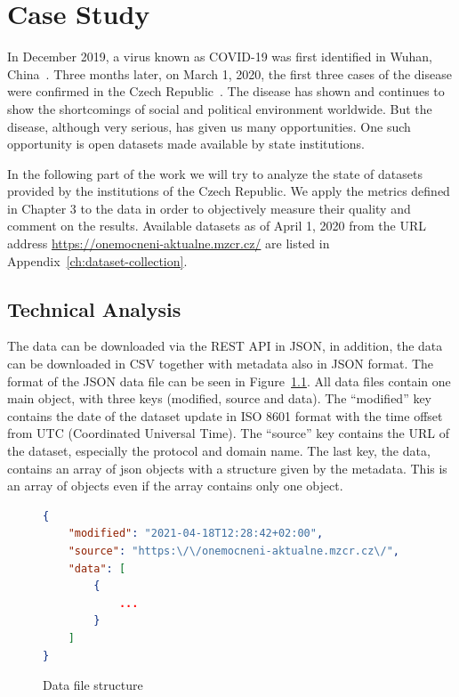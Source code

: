 \chapter{Case Study}\label{ch:case-study}

In December 2019, a virus known as COVID-19 was first identified in Wuhan, China~\cite{seznam-korona2021}.
Three months later, on March 1, 2020, the first three cases of the disease were confirmed in the Czech Republic~\cite{seznam-korona2021}.
The disease has shown and continues to show the shortcomings of social and political environment worldwide.
But the disease, although very serious, has given us many opportunities.
One such opportunity is open datasets made available by state institutions.

In the following part of the work we will try to analyze the state of datasets provided by the institutions of the Czech Republic.
We apply the metrics defined in Chapter 3 to the data in order to objectively measure their quality and comment on the results.
Available datasets as of April 1, 2020 from the URL address \url{https://onemocneni-aktualne.mzcr.cz/} are listed in Appendix~\ref{ch:dataset-collection}.

\section{Technical Analysis}

The data can be downloaded via the REST API in JSON, in addition, the data can be downloaded in CSV together with metadata also in JSON format.
The format of the JSON data file can be seen in Figure~\ref{ls:data}.
All data files contain one main object, with three keys (modified, source and data).
The \enquote{modified} key contains the date of the dataset update in ISO 8601 format with the time offset from UTC (Coordinated Universal Time).
The \enquote{source} key contains the URL of the dataset, especially the protocol and domain name.
The last key, the data, contains an array of json objects with a structure given by the metadata.
This is an array of objects even if the array contains only one object.

\begin{figure}[htb]
    \centering
    
    \begin{lstlisting}[language=json,firstnumber=1]
{
    "modified": "2021-04-18T12:28:42+02:00",
    "source": "https:\/\/onemocneni-aktualne.mzcr.cz\/",
    "data": [
        {
            ...
        }
    ]
}
    \end{lstlisting}

    \caption{Data file structure}
    \label{ls:data}
\end{figure}
\FloatBarrier

